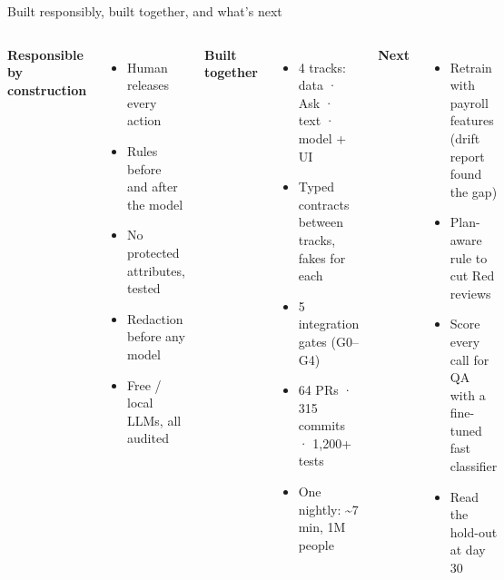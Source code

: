 \documentclass[aspectratio=169,10pt]{beamer}
\begin{document}
\begin{frame}{Built responsibly, built together, and what's next}
\begin{columns}[T]
\textbf{Responsible by construction}
\begin{itemize}\setlength\itemsep{2pt}\small
\item Human releases every action
\item Rules before and after the model
\item No protected attributes, tested
\item Redaction before any model
\item Free / local LLMs, all audited
\end{itemize}
\textbf{Built together}
\begin{itemize}\setlength\itemsep{2pt}\small
\item 4 tracks: data · Ask · text · model + UI
\item Typed contracts between tracks, fakes for each
\item 5 integration gates (G0–G4)
\item 64 PRs · 315 commits · 1,200+ tests
\item One nightly: \textasciitilde 7 min, 1M people
\end{itemize}
\textbf{Next}
\begin{itemize}\setlength\itemsep{2pt}\small
\item Retrain with payroll features (drift report found the gap)
\item Plan-aware rule to cut Red reviews
\item Score every call for QA with a fine-tuned fast classifier
\item Read the hold-out at day 30
\end{itemize}
\end{columns}
\vspace{14pt}
\end{frame}
\end{document}
